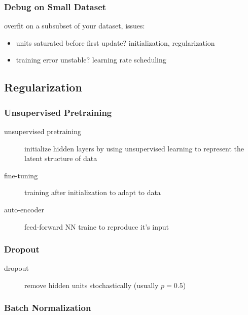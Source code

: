 \documentclass[]{article}
\theoremstyle{definition}
\begin{document}
    \subsubsection{Debug on Small Dataset}%
    \label{ssub:debug_on_small_dataset}

    overfit on a subsubset of your dataset, issues:
    \begin{itemize}
        \item units saturated before first update? initialization, regularization
        \item training error unstable? learning rate scheduling
    \end{itemize}

    \subsection{Regularization}%
    \label{sub:regularization}


    \subsubsection{Unsupervised Pretraining}%
    \label{ssub:unsupervised_pretraining}

    \begin{description}
        \item[unsupervised pretraining] initialize hidden layers by using unsupervised learning to represent the latent structure of data
        \item[fine-tuning] training after initialization to adapt to data
        \item[auto-encoder] feed-forward NN traine to reproduce it's input
    \end{description}

    \subsubsection{Dropout}%
    \label{ssub:dropout}

    \begin{description}
        \item[dropout] remove hidden units stochastically (usually $p = 0.5$) \\

    \end{description}

    \subsubsection{Batch Normalization}%
    \label{ssub:batch_normalization}
\end{document}
